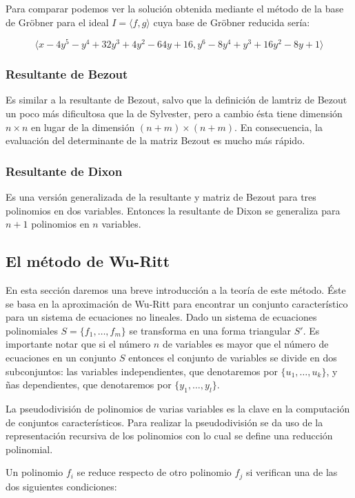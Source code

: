 Para comparar podemos ver la solución obtenida mediante el método de la base de Gröbner para el ideal $I = \langle f,g \rangle$ cuya base de Gröbner reducida sería:

$$\langle x - 4y^5- y^4 + 32y^3 + 4y^2 - 64y + 16 , y^6 - 8y^4 + y^3 + 16y^2 - 8y + 1 \rangle$$

\subsubsection*{Resultante de Bezout}

Es similar a la resultante de Bezout, salvo que la definición de lamtriz de Bezout un poco más dificultosa  que la de Sylvester, pero a cambio ésta tiene dimensión $n \times n$ en lugar de la dimensión $(n+m) \times (n+m)$. En consecuencia, la evaluación del determinante de la matriz Bezout es mucho más rápido.

\subsubsection*{Resultante de Dixon}

Es una versión generalizada de la resultante y matriz de Bezout para tres polinomios en dos variables. Entonces la resultante de Dixon se generaliza para $n+1$ polinomios en $n$ variables.

\subsection{El método de Wu-Ritt}

En esta sección daremos una breve introducción a la teoría de este método. Éste se basa en la aproximación de Wu-Ritt para encontrar un conjunto característico para un sistema de ecuaciones no lineales. Dado un sistema de ecuaciones polinomiales $S = \{ f_1, \dotso, f_m \}$ se transforma en una forma triangular $S'$. Es importante notar que si el número $n$ de variables es mayor que el número de ecuaciones en un conjunto $S$ entonces el conjunto de variables se divide en dos subconjuntos: las variables independientes, que denotaremos por $\{ u_1, \dotso, u_k \}$, y ñas dependientes, que denotaremos por $\{ y_1, \dotso, y_l \}$.
\par La pseudodivisión de polinomios de varias variables es la clave en la computación de conjuntos característicos. Para realizar la pseudodivisión se da uso de la representación recursiva de los polinomios con lo cual se define una reducción polinomial.
\par Un polinomio $f_i$ se reduce respecto de otro polinomio $f_j$ si verifican una de las dos siguientes condiciones:

